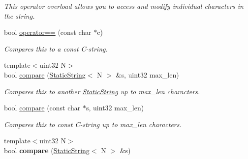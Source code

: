 \begin{DoxyCompactItemize}
\begin{DoxyCompactList}\small\item\em This operator overload allows you to access and modify individual characters in the string. \end{DoxyCompactList}\item 
\hypertarget{classetk_1_1_static_string_ac9392fc07494ee308d271717c250d3cf}{bool \hyperlink{classetk_1_1_static_string_ac9392fc07494ee308d271717c250d3cf}{operator==} (const char $\ast$c)}\label{classetk_1_1_static_string_ac9392fc07494ee308d271717c250d3cf}

\begin{DoxyCompactList}\small\item\em Compares this to a const C-\/string. \end{DoxyCompactList}\item 
\hypertarget{classetk_1_1_static_string_abb40d72d70ffadd308e325165730b86f}{{\footnotesize template$<$uint32 N$>$ }\\bool \hyperlink{classetk_1_1_static_string_abb40d72d70ffadd308e325165730b86f}{compare} (\hyperlink{classetk_1_1_static_string}{Static\-String}$<$ N $>$ \&s, uint32 max\-\_\-len)}\label{classetk_1_1_static_string_abb40d72d70ffadd308e325165730b86f}

\begin{DoxyCompactList}\small\item\em Compares this to another \hyperlink{classetk_1_1_static_string}{Static\-String} up to max\-\_\-len characters. \end{DoxyCompactList}\item 
\hypertarget{classetk_1_1_static_string_a2c4026d012626c7ea92e3e14b30c5739}{bool \hyperlink{classetk_1_1_static_string_a2c4026d012626c7ea92e3e14b30c5739}{compare} (const char $\ast$s, uint32 max\-\_\-len)}\label{classetk_1_1_static_string_a2c4026d012626c7ea92e3e14b30c5739}

\begin{DoxyCompactList}\small\item\em Compares this to const C-\/string up to max\-\_\-len characters. \end{DoxyCompactList}\item 
\hypertarget{classetk_1_1_static_string_ae67693e7f2226f2bbbfdd3841c56abe5}{{\footnotesize template$<$uint32 N$>$ }\\bool {\bfseries compare} (\hyperlink{classetk_1_1_static_string}{Static\-String}$<$ N $>$ \&s)}\label{classetk_1_1_static_string_ae67693e7f2226f2bbbfdd3841c56abe5}


\end{DoxyCompactItemize}
